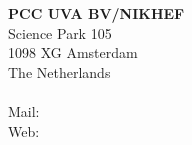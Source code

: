 

\setlength{\parindent}{0pt}
\setlength{\parskip}{1em}


\vspace{10cm} 
\textbf{PCC UVA BV/NIKHEF} \\
Science Park 105\\
1098 XG Amsterdam\\
The Netherlands \\
 \\
Mail:  \\
Web:  \\
